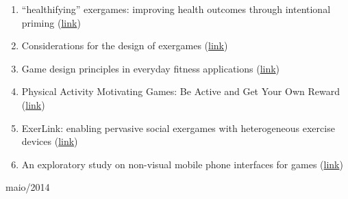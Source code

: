 \documentclass[a4paper,11pt]{article}
\newcommand{\sepitem}{\vspace{0.1in}\item}
\begin{document}
\begin{enumerate}
  \sepitem ``healthifying'' exergames: improving health outcomes through intentional priming (\href{http://dl.acm.org/citation.cfm?id=2556288.2557246&coll=DL&dl=GUIDE&CFID=425338272&CFTOKEN=89111191}{link})
  
  \sepitem Considerations for the design of exergames (\href{http://dl.acm.org/citation.cfm?id=1321261.1321313&coll=DL&dl=GUIDE&CFID=425338272&CFTOKEN=89111191}{link})
  
  \sepitem Game design principles in everyday fitness applications (\href{http://dl.acm.org/citation.cfm?id=1460603&CFID=425338272&CFTOKEN=89111191}{link})
  
  \sepitem Physical Activity Motivating Games: Be Active and Get Your Own Reward (\href{http://dl.acm.org/citation.cfm?id=2395131.2395139&coll=DL&dl=GUIDE&CFID=425338272&CFTOKEN=89111191}{link})
  
  \sepitem ExerLink: enabling pervasive social exergames with heterogeneous exercise devices (\href{http://dl.acm.org/citation.cfm?id=2307636.2307639&coll=DL&dl=GUIDE&CFID=425338272&CFTOKEN=89111191}{link})
  
  \sepitem An exploratory study on non-visual mobile phone interfaces for games (\href{http://dl.acm.org/citation.cfm?id=1497475&CFID=425338272&CFTOKEN=89111191}{link})
  
\end{enumerate}
\vfill

\raggedleft
{\sc maio/2014}
\end{document}

